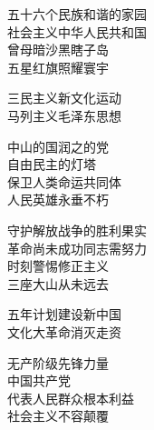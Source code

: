 


\center

五十六个民族和谐的家园\\
社会主义中华人民共和国\\
曾母暗沙黑瞎子岛\\
五星红旗照耀寰宇

三民主义新文化运动\\
马列主义毛泽东思想

中山的国润之的党\\
自由民主的灯塔\\
保卫人类命运共同体\\
人民英雄永垂不朽

守护解放战争的胜利果实\\
革命尚未成功同志需努力\\
时刻警惕修正主义\\
三座大山从未远去

五年计划建设新中国\\
文化大革命消灭走资

无产阶级先锋力量\\
中国共产党\\
代表人民群众根本利益\\
社会主义不容颠覆

